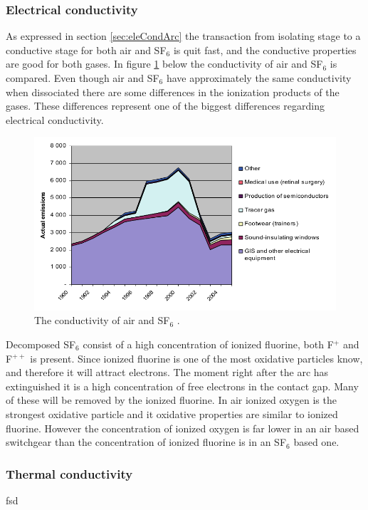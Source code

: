 \documentclass[10pt,a4paper]{article} %
\begin{document}
\subsubsection*{Electrical conductivity}
As expressed in section \ref{sec:eleCondArc} the transaction from isolating stage to a conductive stage for both air and SF$_6$ is quit fast, and the conductive properties are good for both gases. In figure \ref{fig:AirandSF6ConComp} below the conductivity of air and SF${_6}$ is compared. Even though air and SF$_6$ have approximately the same conductivity when dissociated there are some differences in the ionization products of the gases. These differences represent one of the biggest differences regarding electrical conductivity.

\begin{figure}[H]
\centering
\includegraphics[scale=0.6]{Bilder/Theory/emissionsSF6Norway.png}
\caption{The conductivity of air and SF${_6}$ \cite{bib:StatSF6}.} \label{fig:AirandSF6ConComp}
\end{figure}

Decomposed SF${_6}$ consist of a high concentration of ionized fluorine, both F$^+$ and F$^{++}$ is present. Since ionized fluorine is one of the most oxidative particles know, and therefore it will attract electrons. The moment right after the arc has extinguished it is a high concentration of free electrons in the contact gap. Many of these will be removed by the ionized fluorine. In air ionized oxygen is the strongest oxidative particle and it oxidative properties are similar to ionized fluorine. However the concentration of ionized oxygen is far lower in an air based switchgear than the concentration of ionized fluorine is in an SF$_6$ based one.

\subsubsection*{Thermal conductivity}
fsd
\end{document}
